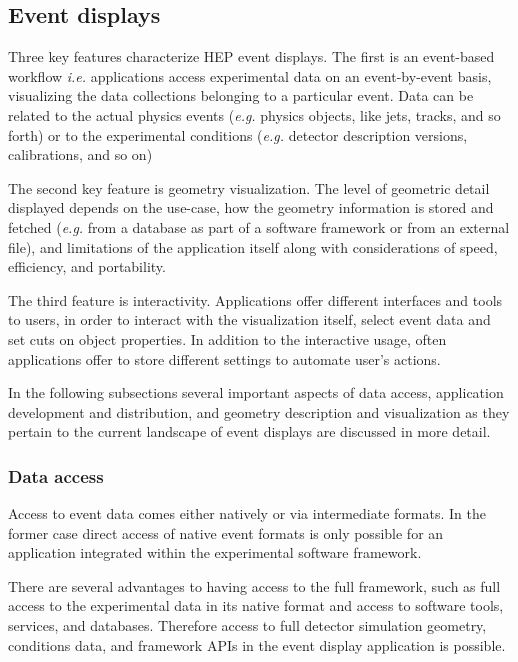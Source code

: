 \documentclass[12pt,a4paper]{article}
\begin{document}
\hypertarget{event-displays}{%
\subsection{Event displays}\label{event-displays}}

Three key features characterize HEP event displays. The first is an event-based workflow {\it i.e.} applications access
experimental data on an event-by-event basis,
visualizing the data collections belonging to a particular event. Data can be related to the
actual physics events ({\it e.g.} physics objects, like jets, tracks, and so forth) or to the experimental
conditions ({\it e.g.} detector description versions, calibrations, and so on)

The second key feature is geometry visualization.
The level of geometric detail displayed depends on the use-case, how the geometry information is stored and fetched ({\it e.g.}
from a database as part of a software framework or from an external file), and limitations of the application itself along with
considerations of speed, efficiency, and portability.

The third feature is interactivity. Applications offer different interfaces and tools to users, in order to interact
with the visualization itself, select event data and set cuts on object properties.
In addition to the interactive usage, often applications offer to store different settings to automate user’s actions.

In the following subsections several important aspects of data access, application development and distribution, and geometry description
and visualization as they pertain to the current landscape of event displays are discussed in more detail.

\hypertarget{data-access}{%
\subsubsection{Data access}\label{data-access}}

Access to event data comes either natively or via intermediate formats. In the former case direct access of native event formats
is only possible for an application integrated within the experimental software framework.

There are several advantages to having access to the full framework, such as full access to the experimental data
in its native format and access to software tools, services, and databases. Therefore access to full detector simulation
geometry, conditions data, and framework APIs in the event display application is possible.
\end{document}
